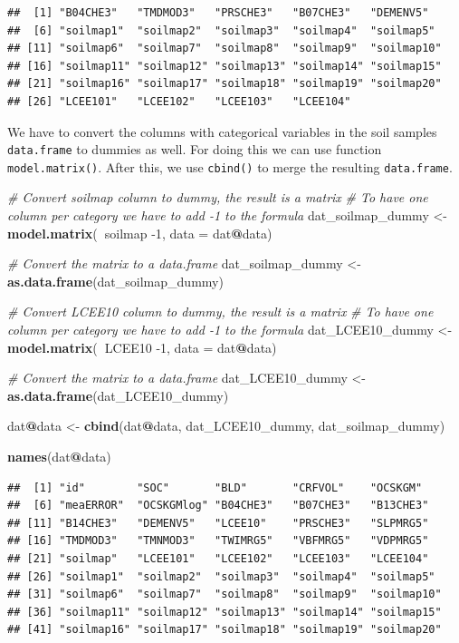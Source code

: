 \documentclass[10pt,b5paper,]{book}
\newenvironment{Shaded}{\begin{snugshade}}{\end{snugshade}}
\newcommand{\CommentTok}[1]{\textcolor[rgb]{0.56,0.35,0.01}{\textit{#1}}}
\newcommand{\DataTypeTok}[1]{\textcolor[rgb]{0.13,0.29,0.53}{#1}}
\newcommand{\DecValTok}[1]{\textcolor[rgb]{0.00,0.00,0.81}{#1}}
\newcommand{\KeywordTok}[1]{\textcolor[rgb]{0.13,0.29,0.53}{\textbf{#1}}}
\newcommand{\NormalTok}[1]{#1}
\newcommand{\OperatorTok}[1]{\textcolor[rgb]{0.81,0.36,0.00}{\textbf{#1}}}
\newcommand{\StringTok}[1]{\textcolor[rgb]{0.31,0.60,0.02}{#1}}
\theoremstyle{definition}
\theoremstyle{definition}
\theoremstyle{definition}
\theoremstyle{remark}
\begin{document}
\begin{verbatim}
##  [1] "B04CHE3"   "TMDMOD3"   "PRSCHE3"   "B07CHE3"   "DEMENV5"  
##  [6] "soilmap1"  "soilmap2"  "soilmap3"  "soilmap4"  "soilmap5" 
## [11] "soilmap6"  "soilmap7"  "soilmap8"  "soilmap9"  "soilmap10"
## [16] "soilmap11" "soilmap12" "soilmap13" "soilmap14" "soilmap15"
## [21] "soilmap16" "soilmap17" "soilmap18" "soilmap19" "soilmap20"
## [26] "LCEE101"   "LCEE102"   "LCEE103"   "LCEE104"
\end{verbatim}

We have to convert the columns with categorical variables in the soil
samples \texttt{data.frame} to dummies as well. For doing this we can
use function \texttt{model.matrix()}. After this, we use
\texttt{cbind()} to merge the resulting \texttt{data.frame}.

\begin{Shaded}
\begin{Highlighting}[]
\CommentTok{# Convert soilmap column to dummy, the result is a matrix}
\CommentTok{# To have one column per category we have to add -1 to the formula}
\NormalTok{dat_soilmap_dummy <-}\StringTok{ }\KeywordTok{model.matrix}\NormalTok{(}\OperatorTok{~}\NormalTok{soilmap }\DecValTok{-1}\NormalTok{, }\DataTypeTok{data =}\NormalTok{ dat}\OperatorTok{@}\NormalTok{data)}

\CommentTok{# Convert the matrix to a data.frame}
\NormalTok{dat_soilmap_dummy <-}\StringTok{ }\KeywordTok{as.data.frame}\NormalTok{(dat_soilmap_dummy)}

\CommentTok{# Convert LCEE10 column to dummy, the result is a matrix}
\CommentTok{# To have one column per category we have to add -1 to the formula}
\NormalTok{dat_LCEE10_dummy <-}\StringTok{ }\KeywordTok{model.matrix}\NormalTok{(}\OperatorTok{~}\NormalTok{LCEE10 }\DecValTok{-1}\NormalTok{, }\DataTypeTok{data =}\NormalTok{ dat}\OperatorTok{@}\NormalTok{data)}

\CommentTok{# Convert the matrix to a data.frame}
\NormalTok{dat_LCEE10_dummy <-}\StringTok{ }\KeywordTok{as.data.frame}\NormalTok{(dat_LCEE10_dummy)}

\NormalTok{dat}\OperatorTok{@}\NormalTok{data <-}\StringTok{ }\KeywordTok{cbind}\NormalTok{(dat}\OperatorTok{@}\NormalTok{data, dat_LCEE10_dummy, dat_soilmap_dummy)}

\KeywordTok{names}\NormalTok{(dat}\OperatorTok{@}\NormalTok{data)}
\end{Highlighting}
\end{Shaded}

\begin{verbatim}
##  [1] "id"        "SOC"       "BLD"       "CRFVOL"    "OCSKGM"   
##  [6] "meaERROR"  "OCSKGMlog" "B04CHE3"   "B07CHE3"   "B13CHE3"  
## [11] "B14CHE3"   "DEMENV5"   "LCEE10"    "PRSCHE3"   "SLPMRG5"  
## [16] "TMDMOD3"   "TMNMOD3"   "TWIMRG5"   "VBFMRG5"   "VDPMRG5"  
## [21] "soilmap"   "LCEE101"   "LCEE102"   "LCEE103"   "LCEE104"  
## [26] "soilmap1"  "soilmap2"  "soilmap3"  "soilmap4"  "soilmap5" 
## [31] "soilmap6"  "soilmap7"  "soilmap8"  "soilmap9"  "soilmap10"
## [36] "soilmap11" "soilmap12" "soilmap13" "soilmap14" "soilmap15"
## [41] "soilmap16" "soilmap17" "soilmap18" "soilmap19" "soilmap20"
\end{verbatim}
\end{document}
